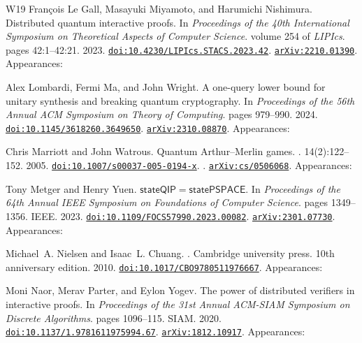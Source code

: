 \documentclass[10pt,a4paper]{article}
\numberwithin{equation}{section}
\numberwithin{figure}{section}
\begin{document}
\begin{thebibliography}{{}W19}
Fran{\c{c}}ois {Le Gall}, Masayuki Miyamoto, and Harumichi Nishimura.
\newblock Distributed quantum interactive proofs.
\newblock In {\em Proceedings of the 40th International Symposium on Theoretical Aspects of Computer Science}. volume 254 of {\em LIPIcs}. pages 42:1--42:21. 2023.
\newblock \href {https://doi.org/10.4230/LIPIcs.STACS.2023.42} {\texttt{doi:10.4230/LIPIcs.STACS.2023.42}}. \href {https://arxiv.org/abs/2210.01390} {\texttt{arXiv:2210.01390}}. Appearances:\!

Alex Lombardi, Fermi Ma, and John Wright.
\newblock A one-query lower bound for unitary synthesis and breaking quantum cryptography.
\newblock In {\em Proceedings of the 56th Annual ACM Symposium on Theory of Computing}. pages 979--990. 2024.
\newblock \href {https://doi.org/10.1145/3618260.3649650} {\texttt{doi:10.1145/3618260.3649650}}. \href {https://arxiv.org/abs/2310.08870} {\texttt{arXiv:2310.08870}}. Appearances:\!

Chris Marriott and John Watrous.
\newblock Quantum {Arthur--Merlin} games.
. 14(2):122--152. 2005.
\newblock \href {https://doi.org/10.1007/s00037-005-0194-x} {\texttt{doi:10.1007/s00037-005-0194-x}}. . \href {https://arxiv.org/abs/cs/0506068} {\texttt{arXiv:cs/0506068}}. Appearances:\!

Tony Metger and Henry Yuen.
\newblock $\mathsf{stateQIP}=\mathsf{statePSPACE}$.
\newblock In {\em Proceedings of the 64th Annual IEEE Symposium on Foundations of Computer Science}. pages 1349--1356. {IEEE}. 2023.
\newblock \href {https://doi.org/10.1109/FOCS57990.2023.00082} {\texttt{doi:10.1109/FOCS57990.2023.00082}}. \href {https://arxiv.org/abs/2301.07730} {\texttt{arXiv:2301.07730}}. Appearances:\!

Michael~A. Nielsen and Isaac~L. Chuang.
.
\newblock Cambridge university press. 10th anniversary edition. 2010.
\newblock \href {https://doi.org/10.1017/CBO9780511976667} {\texttt{doi:10.1017/CBO9780511976667}}. Appearances:\!

Moni Naor, Merav Parter, and Eylon Yogev.
\newblock The power of distributed verifiers in interactive proofs.
\newblock In {\em Proceedings of the 31st Annual ACM-SIAM Symposium on Discrete Algorithms}. pages 1096--115. SIAM. 2020.
\newblock \href {https://doi.org/10.1137/1.9781611975994.67} {\texttt{doi:10.1137/1.9781611975994.67}}. \href {https://arxiv.org/abs/1812.10917} {\texttt{arXiv:1812.10917}}. Appearances:\!


\end{thebibliography}
\end{document}
